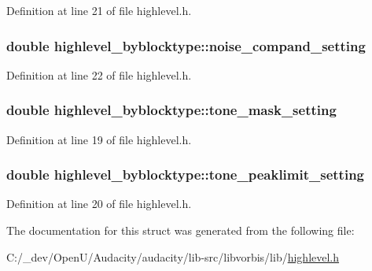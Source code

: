 Definition at line 21 of file highlevel.\+h.

\subsubsection[{\texorpdfstring{noise\+\_\+compand\+\_\+setting}{noise_compand_setting}}]{\setlength{\rightskip}{0pt plus 5cm}double highlevel\+\_\+byblocktype\+::noise\+\_\+compand\+\_\+setting}\hypertarget{structhighlevel__byblocktype_a30f1f5f31f0948659f7739541c68273b}{}\label{structhighlevel__byblocktype_a30f1f5f31f0948659f7739541c68273b}


Definition at line 22 of file highlevel.\+h.

\subsubsection[{\texorpdfstring{tone\+\_\+mask\+\_\+setting}{tone_mask_setting}}]{\setlength{\rightskip}{0pt plus 5cm}double highlevel\+\_\+byblocktype\+::tone\+\_\+mask\+\_\+setting}\hypertarget{structhighlevel__byblocktype_a4ddd74f9ea85b93e0f8a81da2321dbdd}{}\label{structhighlevel__byblocktype_a4ddd74f9ea85b93e0f8a81da2321dbdd}


Definition at line 19 of file highlevel.\+h.

\subsubsection[{\texorpdfstring{tone\+\_\+peaklimit\+\_\+setting}{tone_peaklimit_setting}}]{\setlength{\rightskip}{0pt plus 5cm}double highlevel\+\_\+byblocktype\+::tone\+\_\+peaklimit\+\_\+setting}\hypertarget{structhighlevel__byblocktype_af7bf4884a347918e37addd21418be5f6}{}\label{structhighlevel__byblocktype_af7bf4884a347918e37addd21418be5f6}


Definition at line 20 of file highlevel.\+h.



The documentation for this struct was generated from the following file\+:\begin{DoxyCompactItemize}
\item 
C\+:/\+\_\+dev/\+Open\+U/\+Audacity/audacity/lib-\/src/libvorbis/lib/\hyperlink{highlevel_8h}{highlevel.\+h}\end{DoxyCompactItemize}
